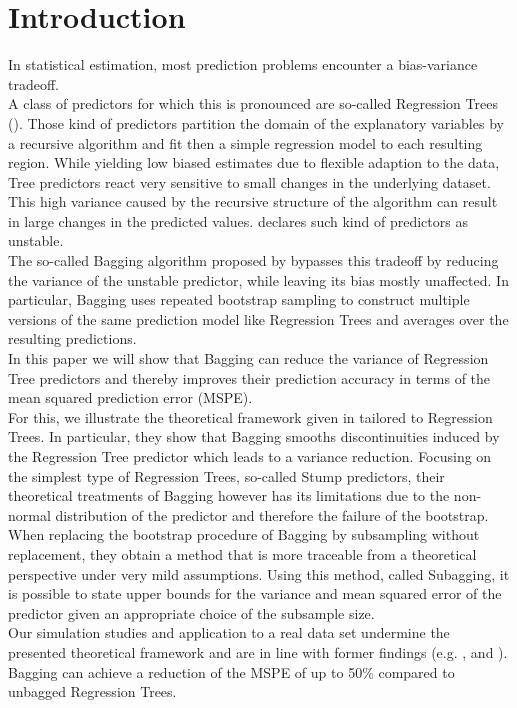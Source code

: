 \section{Introduction}
In statistical estimation, most prediction problems encounter a bias-variance tradeoff. \\
A class of predictors for which this is pronounced are so-called Regression Trees (\cite{Breiman1984}). 
Those kind of predictors partition the domain of the explanatory variables by a recursive algorithm and fit then a simple regression model to each resulting region. 
While yielding low biased estimates due to flexible adaption to the data, Tree predictors react very sensitive to small changes in the underlying dataset.
This high variance caused by the recursive structure of the algorithm can
result in large changes in the predicted values. \cite{breiman1996B} declares such kind of predictors as unstable.\\
The so-called Bagging algorithm proposed by \cite{Breiman1996} bypasses this tradeoff by reducing the variance of the unstable predictor, while leaving its bias mostly unaffected.
In particular, Bagging uses repeated bootstrap sampling to construct multiple versions of the same prediction model like Regression Trees and averages over the resulting predictions.\\
In this paper we will show that Bagging can reduce the variance of Regression Tree predictors and thereby improves their prediction accuracy in terms of the mean squared prediction error (MSPE).\\
For this, we illustrate the theoretical framework given in \cite{Buhlmann2002} tailored to Regression Trees. In particular, they show that Bagging smooths discontinuities induced by the Regression Tree predictor which leads to a variance reduction.
Focusing on the simplest type of Regression Trees, so-called Stump predictors, their theoretical treatments of Bagging however has its limitations due to the non-normal distribution of the predictor and therefore the failure of the bootstrap. When replacing the bootstrap procedure of Bagging by subsampling without replacement, they obtain a method that is more traceable from a theoretical perspective under very mild assumptions. Using this method, called Subagging, it is possible to state upper bounds for the variance and mean squared error of the predictor given an appropriate choice of the subsample size.\\
Our simulation studies and application to a real data set undermine the presented theoretical framework and are in line with former findings (e.g. \cite{breiman1998}, \cite{Bauer1999} and \cite{Dietterich2000}). Bagging can achieve a reduction of the MSPE of up to  50\% compared to unbagged Regression Trees. 
